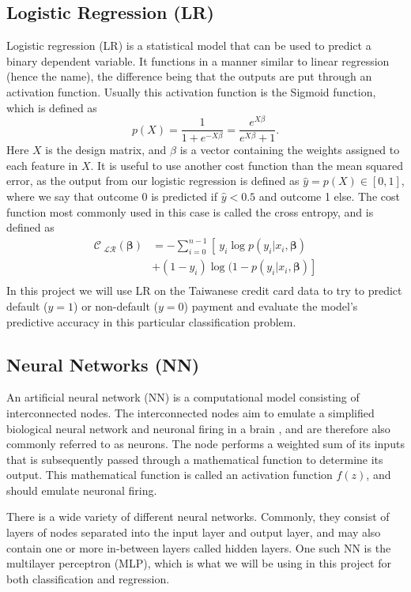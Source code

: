 \documentclass[a4paper, 11pt, twocolumn]{article}
\begin{document}
\subsection{Logistic Regression (LR)}
Logistic regression (LR)  is a statistical model that can be used to predict a 
binary dependent variable. It functions in a manner similar to linear regression 
(hence the name), the difference being that the outputs are put through an 
activation function. Usually this activation function is the Sigmoid function, 
which is defined as
\begin{equation}
p(X) = \frac{1}{1 + e^{-X \beta}} =\frac{e^{X \beta}}{e^{X \beta}+1}.
\label{sigmoid}
\end{equation}
Here $X$ is the design matrix, and $\beta$ is a vector containing the weights 
assigned to each
feature in $X$. It is useful to use another cost function than the mean squared 
error, as the output
from our logistic regression is defined as $\hat{y}=p(X)\in [0, 1]$, where we 
say that outcome 0 is predicted if $\hat{y}< 0.5$ and outcome 1 else. The cost 
function most commonly used in this case is called the cross entropy, and is 
defined as
\begin{align}
\mathcal{C_\text{ LR}}(\bm{\beta}) &= -\sum_{i=0}^{n-1} \left[\  y_i\log p(y_i|x_i, \bm{\beta}) \right. \\
 &\left.+ (1-y_i)\log(1-p(y_i|x_i,\bm{\beta})    \right] \\
\end{align}
In this project we will use LR on the Taiwanese credit card data to try to predict 
default ($y=1$) or non-default ($y=0$) payment and evaluate the model's predictive 
accuracy in this particular classification problem.

\subsection{Neural Networks (NN)}

An artificial neural network (NN) is a computational model consisting of 
interconnected nodes. The interconnected nodes aim to emulate a simplified 
biological neural network and neuronal firing in a brain , and are therefore 
also commonly referred to as neurons.  The node performs a weighted sum of its 
inputs that is subsequently passed through a mathematical function to determine 
its output. This mathematical function is called an activation function $f(z)$, 
and should emulate neuronal firing. 

There is a wide variety of different neural networks. Commonly, they consist of 
layers of nodes separated into the input layer and output layer, and may also 
contain one or more in-between layers called hidden layers. One such NN is the 
multilayer perceptron (MLP), which is what we will be using in this project for 
both classification and regression.
\end{document}
